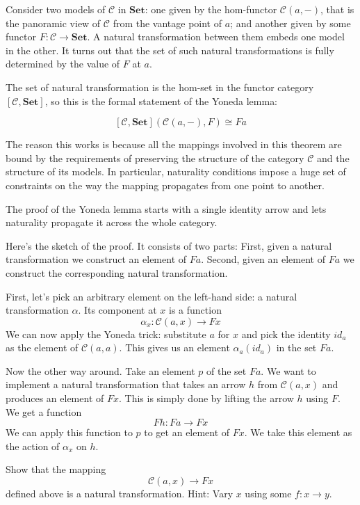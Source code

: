 \documentclass[DaoFP]{subfiles}
\begin{document}
Consider two models of $\mathcal{C}$ in $\mathbf{Set}$: one given by the hom-functor  $\mathcal{C}(a, -)$, that is the panoramic view of $\mathcal{C}$ from the vantage point of $a$; and another given by some functor $F \colon \mathcal{C} \to \mathbf{Set}$. A natural transformation between them embeds one model in the other. It turns out that the set of such natural transformations is fully determined by the value of $F$ at $a$.

The set of natural transformation is the hom-set in the functor category $[\mathcal{C}, \mathbf{Set}]$, so this is the formal statement of the Yoneda lemma:

\[ [\mathcal{C}, \mathbf{Set}]( \mathcal{C}(a, -), F) \cong F a \]

The reason this works is because all the mappings involved in this theorem are bound by the requirements of preserving the structure of the category $\mathcal{C}$ and the structure of its models. In particular, naturality conditions impose a huge set of constraints on the way the mapping propagates from one point to another. 

The proof of the Yoneda lemma starts with a single identity arrow and lets naturality propagate it across the whole category.

Here's the sketch of the proof. It consists of two parts: First, given a natural transformation we construct an element of $F a$. Second, given an element of $F a$ we construct the corresponding natural transformation. 

First, let's pick an arbitrary element on the left-hand side: a natural transformation $\alpha$. Its component at $x$ is a function
\[ \alpha_x \colon \mathcal{C}(a, x) \to F x \]
We can now apply the Yoneda trick: substitute $a$ for $x$ and pick the identity $id_a$ as the element of $\mathcal{C}(a, a)$. This gives us an element $\alpha_a (id_a)$ in the set $F a$.

Now the other way around. Take an element $p$ of the set $F a$. We want to implement a natural transformation that takes an arrow $h$ from $ \mathcal{C}(a, x)$ and produces an element of $F x$. This is simply done by lifting the arrow $h$ using $F$. We get a function
\[F h \colon F a \to F x \]
We can apply this function to $p$ to get an element of $F x$. We take this element as the action of $\alpha_x$ on $h$.

\begin{exercise}
Show that the mapping 
\[ \mathcal{C}(a, x) \to F x\]
defined above is a natural transformation. Hint: Vary $x$ using some $f \colon x \to y$.
\end{exercise}
\end{document}

